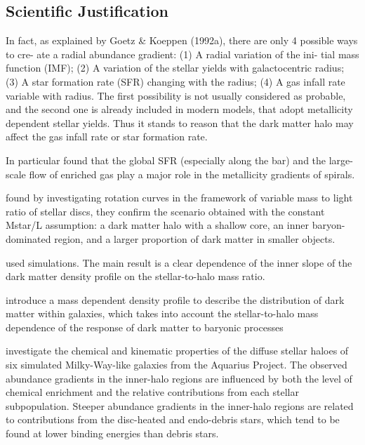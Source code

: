 \documentclass[11pt, a4paper, onecolumn]{article}
\begin{document}

\begin{multicols}{2}

\section{Scientific Justification}

    \citet{sanchez12} In fact, as explained by Goetz \& Koeppen (1992a),
    there are only 4 possible ways to cre- ate a radial abundance gradient:
    (1) A radial variation of the ini- tial mass function (IMF); (2) A
    variation of the stellar yields with galactocentric radius; (3) A star
    formation rate (SFR) changing with the radius; (4) A gas infall rate
    variable with radius.  The first possibility is not usually considered as
    probable, and the second one is already included in modern models, that
    adopt metallicity dependent stellar yields. Thus it stands to reason that
    the dark matter halo may affect the gas infall rate or star formation
    rate.


    In particular 
    \citet{martel13} found that the global SFR (especially along the bar) and
    the large-scale flow of enriched gas play a major role in the metallicity
    gradients of spirals.

    \citet{portinari10} found by investigating rotation curves in the framework
    of variable mass to light ratio of stellar discs, they confirm the scenario
    obtained with the constant Mstar/L assumption: a dark matter halo with a
    shallow core, an inner baryon-dominated region, and a larger proportion of
    dark matter in smaller objects.


    \citet{dicintio14} used simulations. The main result is a clear dependence
    of the inner slope of the dark matter density profile on the
    stellar-to-halo mass ratio.

    \citet{dicintio14b} introduce a mass dependent density profile to describe
    the distribution of dark matter within galaxies, which takes into account
    the stellar-to-halo mass dependence of the response of dark matter to
    baryonic processes

    \citet{tissera13} investigate the chemical and kinematic properties of the
    diffuse stellar haloes of six simulated Milky-Way-like galaxies from the
    Aquarius Project. The observed abundance gradients in the inner-halo
    regions are influenced by both the level of chemical enrichment and the
    relative contributions from each stellar subpopulation. Steeper abundance
    gradients in the inner-halo regions are related to contributions from the
    disc-heated and endo-debris stars, which tend to be found at lower binding
    energies than debris stars. 


\end{multicols}
\end{document}
